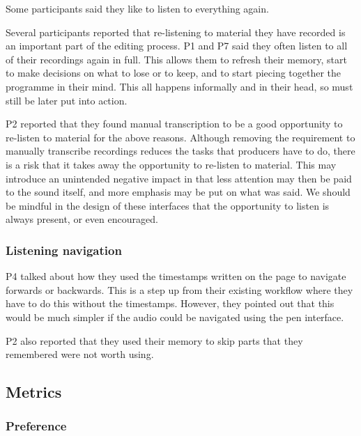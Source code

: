
Some participants said they like to listen to everything again.

Several participants reported that re-listening to material they have recorded is an important part of the editing
process. P1 and P7 said they often listen to all of their recordings again in full. This allows them to refresh their
memory, start to make decisions on what to lose or to keep, and to start piecing together the programme in their mind.
This all happens informally and in their head, so must still be later put into action.

P2 reported that they found manual transcription to be a good opportunity to re-listen to material for the above
reasons. Although removing the requirement to manually transcribe recordings reduces the tasks that producers have to
do, there is a risk that it takes away the opportunity to re-listen to material. This may introduce an unintended
negative impact in that less attention may then be paid to the sound itself, and more emphasis may be put on what was
said. We should be mindful in the design of these interfaces that the opportunity to listen is always present, or even
encouraged.

\subsubsection{Listening navigation}

P4 talked about how they used the timestamps written on the page to navigate forwards or backwards. This is a step up
from their existing workflow where they have to do this without the timestamps. However, they pointed out that this
would be much simpler if the audio could be navigated using the pen interface.

P2 also reported that they used their memory to skip parts that they remembered were not worth using.

\subsection{Metrics}

\subsubsection{Preference}

